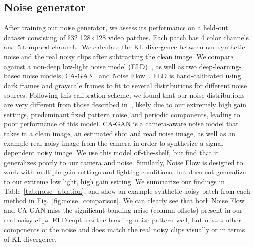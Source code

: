 \documentclass[final]{cvpr}
\begin{document}
\subsection{Noise generator}

After training our noise generator, we assess its performance on a held-out dataset consisting of 832 128$\times$128 video patches. Each patch has 4 color channels and 5 temporal channels. We calculate the KL divergence between our synthetic noise and the real noisy clips after subtracting the clean image. We compare against a non-deep low-light noise model (ELD)~\cite{wei2020physics}, as well as two deep-learning-based noise models, CA-GAN~\cite{chang2020learning} and Noise Flow~\cite{abdelhamed2019noise}. ELD is hand-calibrated using dark frames and grayscale frames to fit to several distributions for different noise sources. Following this calibration scheme, we found that our noise distributions are very different from those described in~\cite{wei2020physics}, likely due to our extremely high gain settings, predominant fixed pattern noise, and periodic components, leading to poor performance of this model. CA-GAN is a camera-aware noise model that takes in a clean image, an estimated shot and read noise image, as well as an example real noisy image from the camera in order to synthesize a signal-dependent noisy image. We use this model off-the-shelf, but find that it generalizes poorly to our camera and noise. Similarly, Noise Flow is designed to work with multiple gain settings and lighting conditions, but does not generalize to our extreme low light, high gain setting. We summarize our findings in Table~\ref{tab:noise_ablation}, and show an example synthetic noisy patch from each method in Fig.~\ref{fig:noise_comparison}. We can clearly see that both Noise Flow and CA-GAN miss the significant banding noise (column offsets) present in our real noisy clips. ELD captures the banding noise pattern well, but misses other components of the noise and does match the real noisy clips visually or in terms of KL divergence. 
 \vspace{-2mm}
\end{document}

